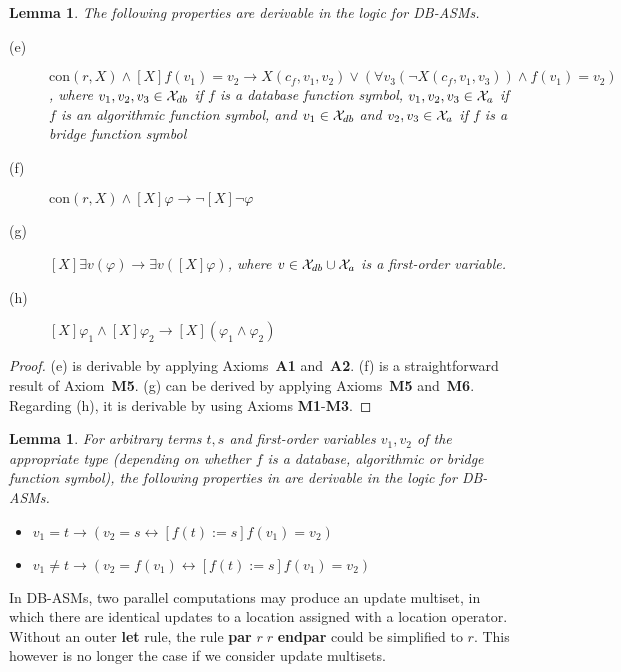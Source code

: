 \documentclass[preprint,11pt]{elsarticle}
\newtheorem{lemma}[theorem]{Lemma}
\theoremstyle{definition}
\theoremstyle{remark}
\begin{document}
\begin{lemma}\label{lem-soundness-modaloperator}
The following properties are derivable in the logic for DB-ASMs.
\begin{description}
  \item[(e)] $\mathrm{con}(r,X) \wedge [X]f(v_1)=v_2\rightarrow X(c_f,v_1,v_2)\vee(\forall v_3 (\neg X(c_f,v_1,v_3)) \wedge f(v_1)=v_2)$, where $v_1, v_2, v_3 \in {\cal X}_{db}$ if $f$ is a database function symbol, $v_1, v_2, v_3 \in {\cal X}_{a}$ if $f$ is an algorithmic function symbol, and $v_1 \in {\cal X}_{db}$ and $v_2, v_3 \in {\cal X}_{a}$ if $f$ is a bridge function symbol\smallskip
  \item[(f)] $\mathrm{con}(r,X) \wedge [X]\varphi \rightarrow \neg[X]\neg\varphi$\smallskip
  \item[(g)] $[X]\exists v (\varphi) \rightarrow \exists v ([X]\varphi)$, where $v \in {\cal X}_{db} \cup {\cal X}_{a}$ is a first-order variable.\smallskip
  \item[(h)] $[X]\varphi_1 \wedge [X]\varphi_2 \rightarrow [X] (\varphi_1 \wedge \varphi_2)$\smallskip
\end{description}


\end{lemma}

\begin{proof}
(e) is derivable by applying Axioms~\textbf{A1} and~\textbf{A2}. (f)
is a straightforward result of Axiom~\textbf{M5}. (g) can be derived
by applying Axioms~\textbf{M5} and~\textbf{M6}. Regarding (h), it is
derivable by using Axioms \textbf{M1}-\textbf{M3}.
\end{proof}



\begin{lemma}For arbitrary terms $t, s$ and first-order variables $v_1, v_2$ of the appropriate type (depending on whether $f$ is a database, algorithmic or bridge function symbol), the following properties in \cite{GroenboomFLEA95} are derivable in the logic for DB-ASMs.
\begin{itemize}
  \item $v_1=t \rightarrow (v_2=s \leftrightarrow [f(t):=s] f(v_1)=v_2)$
  \item $v_1 \neq t \rightarrow (v_2 = f(v_1) \leftrightarrow[f(t):=s]f(v_1)=v_2)$
\end{itemize}
\end{lemma}

In DB-ASMs, two parallel computations may produce an update multiset,
in which there are identical updates to a location assigned with a
location operator. Without an outer \textbf{let} rule, the rule \textbf{par} $ r \; r $ \textbf{endpar}
could be simplified to $r$. This however is no longer the case if we consider update multisets.
\end{document}
